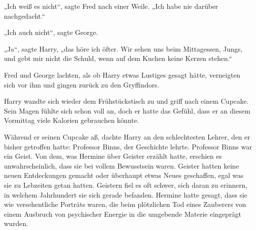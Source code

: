 „Ich weiß es nicht“, sagte Fred nach einer Weile.
„Ich habe nie darüber nachgedacht.“

„Ich auch nicht“, sagte George.

„Ja“, sagte Harry, „das höre ich öfter. Wir sehen uns beim Mittagessen, Jungs, und gebt mir nicht die Schuld, wenn auf dem Kuchen keine Kerzen stehen.“

Fred und George lachten, als ob Harry etwas Lustiges gesagt hätte, verneigten sich vor ihm und gingen zurück zu den Gryffindors.

Harry wandte sich wieder dem Frühstückstisch zu und griff nach einem Cupcake. Sein Magen fühlte sich schon voll an, doch er hatte das Gefühl, dass er an diesem Vormittag viele Kalorien gebrauchen könnte.

Während er seinen Cupcake aß, dachte Harry an den schlechtesten Lehrer, den er bisher getroffen hatte: Professor Binns, der Geschichte lehrte. Professor Binns war ein Geist. Von dem, was Hermine über Geister erzählt hatte, erschien es unwahrscheinlich, dass sie bei vollem Bewusstsein waren. Geister hatten keine neuen Entdeckungen gemacht oder überhaupt etwas Neues geschaffen, egal was sie zu Lebzeiten getan hatten. Geistern fiel es oft schwer, sich daran zu erinnern, in welchem Jahrhundert sie sich gerade befanden. Hermine hatte gesagt, dass sie wie versehentliche Porträts waren, die beim plötzlichen Tod eines Zauberers von einem Ausbruch von psychischer Energie in die umgebende Materie eingeprägt wurden.

